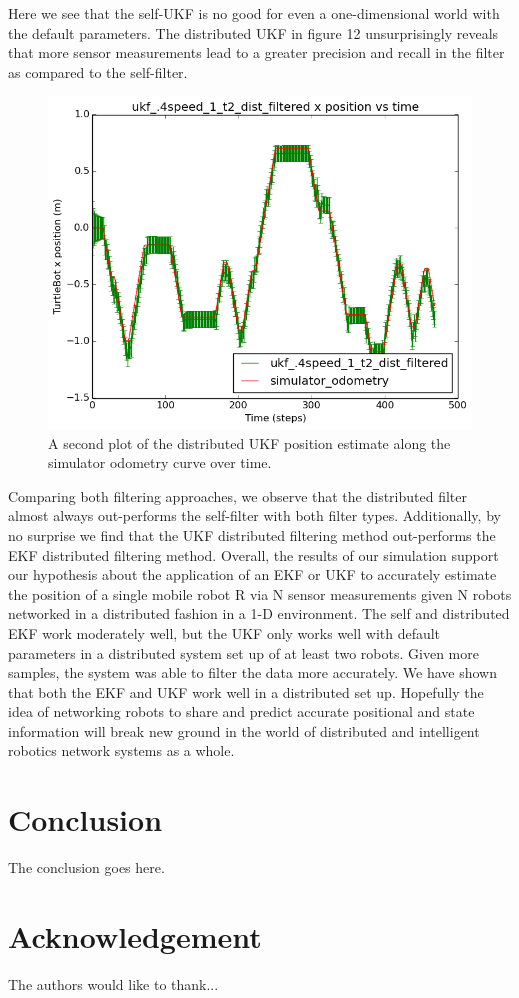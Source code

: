 \documentclass[conference]{IEEEtran} \usepackage[T1]{fontenc} \usepackage[backend=biber, style=ieee]{biblatex}
\begin{document}
Here we see that the self-UKF is no good for even a one-dimensional world with the default parameters.
The distributed UKF in figure 12 unsurprisingly reveals that more sensor measurements lead to a greater
precision and recall in the filter as compared to the self-filter. 

\begin{figure}[!ht]
\label{pic12} 
\centering 
\includegraphics[scale=.45]{ukf_4speed_1_t2_dist_filtered_pos_err_graph}
\caption {A second plot of the distributed UKF position estimate along the simulator 
odometry curve over time.}
\end{figure}

Comparing both filtering approaches, we observe that the distributed filter almost always out-performs the self-filter 
with both filter types. Additionally, by no surprise we find that the UKF distributed filtering method out-performs the EKF distributed
filtering method. Overall, the results of our simulation support our hypothesis about the application of an EKF or UKF to accurately
estimate the position of a single mobile robot R via N sensor measurements given N robots networked in a distributed fashion in a 1-D environment. 
The self and distributed EKF work moderately well, but the UKF only works well with default parameters in a distributed system set up of at least 
two robots. Given more samples, the system was able to filter the data more accurately. We have shown that both the EKF and UKF work well in a 
distributed set up. Hopefully the idea of networking robots to share and predict accurate positional and state information will break new ground in 
the world of distributed and intelligent robotics network systems as a whole.

\section{Conclusion} \label{Conclusion} 
The conclusion goes here.

\section*{Acknowledgement}

The authors would like to thank...

\printbibliography
\end{document}
